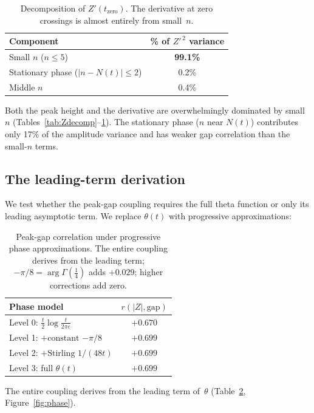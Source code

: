 \documentclass[11pt,a4paper]{article}
\begin{document}
\begin{table}[ht]
\centering
\begin{tabular}{@{}lc@{}}
\toprule
Component & \% of $Z'^{\,2}$ variance \\
\midrule
Small $n$ ($n \le 5$)                & \textbf{99.1\%} \\
Stationary phase ($|n - N(t)| \le 2$) & 0.2\% \\
Middle $n$                           & 0.4\% \\
\bottomrule
\end{tabular}
\caption{Decomposition of $Z'(t_{\mathrm{zero}})$. The derivative at zero crossings is almost entirely from small~$n$.}
\label{tab:Zpdecomp}
\end{table}

Both the peak height and the derivative are overwhelmingly dominated by small~$n$ (Tables~\ref{tab:Zdecomp}--\ref{tab:Zpdecomp}).
The stationary phase ($n$ near $N(t)$) contributes only 17\% of the amplitude variance and has weaker gap correlation than the small-$n$ terms.

\subsection{The leading-term derivation}

We test whether the peak-gap coupling requires the full theta function or only its leading asymptotic term.
We replace $\theta(t)$ with progressive approximations:

\begin{table}[ht]
\centering
\begin{tabular}{@{}lc@{}}
\toprule
Phase model & $r(|Z|, \mathrm{gap})$ \\
\midrule
Level 0: $\frac{t}{2}\log\frac{t}{2\pi e}$ & $+0.670$ \\[3pt]
Level 1: $+ \text{constant } {-\pi/8}$ & $\mathbf{+0.699}$ \\[3pt]
Level 2: $+ \text{Stirling } 1/(48t)$ & $+0.699$ \\[3pt]
Level 3: full $\theta(t)$ & $+0.699$ \\
\bottomrule
\end{tabular}
\caption{Peak-gap correlation under progressive phase approximations. The entire coupling derives from the leading term; $-\pi/8 = \arg\Gamma(\frac{1}{4})$ adds $+0.029$; higher corrections add zero.}
\label{tab:phase}
\end{table}

The entire coupling derives from the leading term of~$\theta$ (Table~\ref{tab:phase}, Figure~\ref{fig:phase}).
\end{document}
